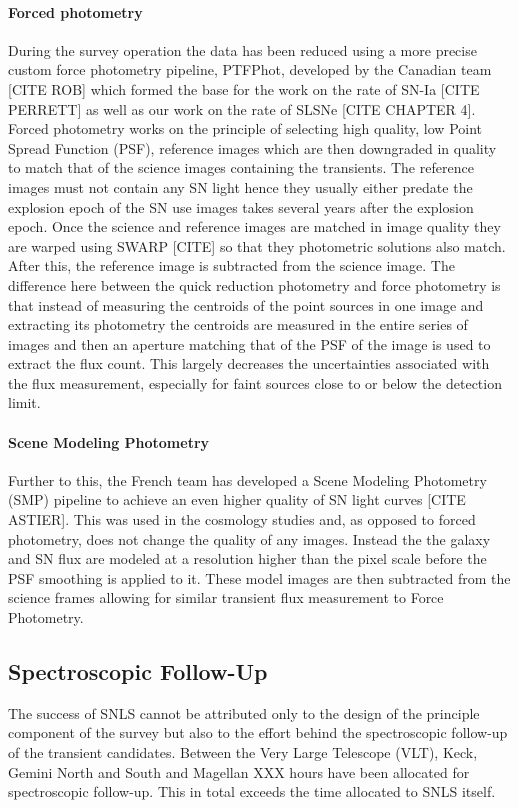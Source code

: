 \paragraph{Forced photometry}
During the survey operation the data has been reduced using a more precise custom force photometry pipeline, PTFPhot, developed by the Canadian team [CITE ROB] which formed the base for the work on the rate of SN-Ia [CITE PERRETT] as well as our work on the rate of SLSNe [CITE CHAPTER 4]. Forced photometry works on the principle of selecting high quality, low Point Spread Function (PSF), reference images which are then downgraded in quality to match that of the science images containing the transients. The reference images must not contain any SN light hence they usually either predate the explosion epoch of the SN use images takes several years after the explosion epoch. Once the science and reference images are matched in image quality they are warped using SWARP [CITE] so that they photometric solutions also match. After this, the reference image is subtracted from the science image. The difference here between the quick reduction photometry and force photometry is that instead of measuring the centroids of the point sources in one image and extracting its photometry the centroids are measured in the entire series of images and then an aperture matching that of the PSF of the image is used to extract the flux count. This largely decreases the uncertainties associated with the flux measurement, especially for faint sources close to or below the detection limit.

\paragraph{Scene Modeling Photometry}
Further to this, the French team has developed a Scene Modeling Photometry (SMP) pipeline to achieve an even higher quality of SN light curves [CITE ASTIER]. This was used in the cosmology studies and, as opposed to forced photometry, does not change the quality of any images. Instead the the galaxy and SN flux are modeled at a resolution higher than the pixel scale before the PSF smoothing is applied to it. These model images are then subtracted from the science frames allowing for similar transient flux measurement to Force Photometry.  
 
\subsection{Spectroscopic Follow-Up}
The success of SNLS cannot be attributed only to the design of the principle component of the survey but also to the effort behind the spectroscopic follow-up of the transient candidates. Between the Very Large Telescope (VLT), Keck, Gemini North and South and Magellan XXX hours have been allocated for spectroscopic follow-up. This in total exceeds the time allocated to SNLS itself. 

